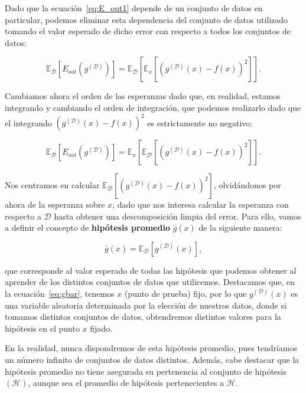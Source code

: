 Dado que la ecuación~\eqref{eq:E_out1} depende de un conjunto de datos en particular, podemos eliminar esta dependencia del conjunto de datos utilizado tomando el valor esperado de dicho error con respecto a todos los conjuntos de datos:

\begin{equation}\label{eq:E_out2}
    \mathbb{E}_{\mathcal{D}}[E_{out}(g^{\mathcal{(D)}})] = \mathbb{E}_{\mathcal{D}}[\mathbb{E}_{x}[{(g^{\mathcal{(D)}}(x) - f(x))}^2]]. 
\end{equation}

Cambiamos ahora el orden de las esperanzas dado que, en realidad, estamos integrando y cambiando el orden de integración, que podemos realizarlo dado que el integrando ${(g^{\mathcal{(D)}}(x) - f(x))}^2$ es estrictamente no negativo:

\begin{equation}\label{eq:E_out3}
    \mathbb{E}_{\mathcal{D}}[E_{out}(g^{\mathcal{(D)}})] = \mathbb{E}_{x}[\mathbb{E}_{\mathcal{D}}[{(g^{\mathcal{(D)}}(x) - f(x))}^2]].
\end{equation}

Nos centramos en calcular $\mathbb{E}_{\mathcal{D}}[{(g^{\mathcal{(D)}}(x) - f(x))}^2]$, olvidándonos por ahora de la esperanza sobre $x$, dado que nos interesa calcular la esperanza con respecto a $\mathcal{D}$ hasta obtener una descomposición limpia del error. Para ello, vamos a definir el concepto de \textbf{hipótesis promedio} $\bar{g}(x)$ de la siguiente manera:

\begin{equation}\label{eq:gbar}
    \bar{g}(x) = \mathbb{E}_{\mathcal{D}}[g^{\mathcal{(D)}}(x)],
\end{equation}

que corresponde al valor esperado de todas las hipótesis que podemos obtener al aprender de los distintos conjuntos de datos que utilicemos. Destacamos que, en la ecuación~\eqref{eq:gbar}, tenemos $x$ (punto de prueba) fijo, por lo que $g^{\mathcal{(D)}}(x)$ es una variable aleatoria determinada por la elección de nuestros datos, donde si tomamos distintos conjuntos de datos, obtendremos distintos valores para la hipótesis en el punto $x$ fijado. 

En la realidad, nunca dispondremos de esta hipótesis promedio, pues tendríamos un número infinito de conjuntos de datos distintos. Además, cabe destacar que la hipótesis promedio no tiene asegurada su pertenencia al conjunto de hipótesis $\mathcal{(H)}$, aunque sea el promedio de hipótesis pertenecientes a $\mathcal{H}$.

